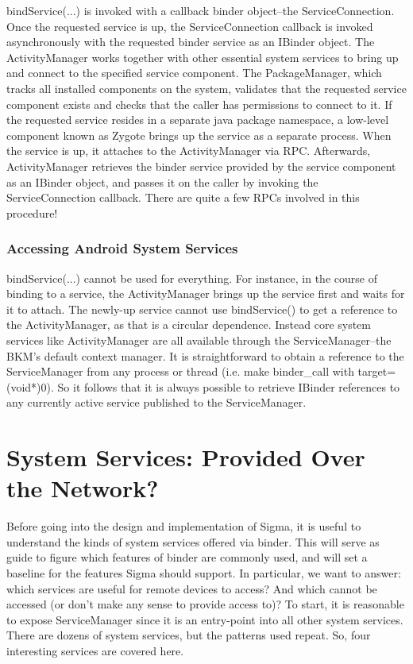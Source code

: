 \documentclass[prodmode]{acmlarge}
\begin{document}
bindService(...) is invoked with a callback binder object--the ServiceConnection. Once the requested service is up, the ServiceConnection callback is invoked asynchronously with the requested binder service as an IBinder object. The ActivityManager works together with other essential system services to bring up and connect to the specified service component. The PackageManager, which tracks all installed components on the system, validates that the requested service component exists and checks that the caller has permissions to connect to it. If the requested service resides in a separate java package namespace, a low-level component known as Zygote brings up the service as a separate process. When the service is up, it attaches to the ActivityManager via RPC. Afterwards, ActivityManager retrieves the binder service provided by the service component as an IBinder object, and passes it on the caller by invoking the ServiceConnection callback. There are quite a few RPCs involved in this procedure!

\subsubsection{Accessing Android System Services}
bindService(...) cannot be used for everything. For instance, in the course of binding to a service, the ActivityManager brings up the service first and waits for it to attach. The newly-up service cannot use bindService() to get a reference to the ActivityManager, as that is a circular dependence. Instead core system services like ActivityManager are all available through the ServiceManager--the BKM's default context manager. It is straightforward to obtain a reference to the ServiceManager from any process or thread (i.e. make binder\_call with target=(void*)0). So it follows that it is always possible to retrieve IBinder references to any currently active service published to the ServiceManager.

\section{System Services: Provided Over the Network?}
\label{sec:SystemServices}
Before going into the design and implementation of Sigma, it is useful to understand the kinds of system services offered via binder. This will serve as guide to figure which features of binder are commonly used, and will set a baseline for the features Sigma should support. In particular, we want to answer: which services are useful for remote devices to access? And which cannot be accessed (or don't make any sense to provide access to)?  To start, it is reasonable to expose ServiceManager since it is an entry-point into all other system services. There are dozens of system services, but the patterns used repeat. So, four interesting services are covered here.
\end{document}
